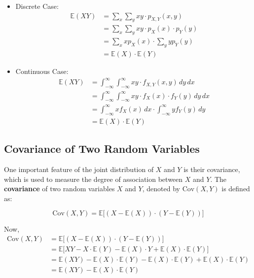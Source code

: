 \documentclass[twoside]{book}
\begin{document}
\begin{itemize}

\item{Discrete Case}:
\begin{align*}
    \mathbb{E}(XY) &= \sum_{x} \sum_{y} xy \cdot p_{X,Y}(x, y)\\
    &=\sum_{x} \sum_{y} xy \cdot p_{X}(x)\cdot p_{Y}(y)\\
    &= \sum_{x} x p_X(x) \cdot  \sum_{y} y p_Y(y) \\
    &= \mathbb{E}(X) \cdot \mathbb{E}(Y)
\end{align*}

\item{Continuous Case}:
\begin{align*}
    \mathbb{E}(XY) &= \int_{-\infty}^{\infty} \int_{-\infty}^{\infty} xy \cdot f_{X,Y}(x, y) \, dy \, dx\\
    &= \int_{-\infty}^{\infty} \int_{-\infty}^{\infty} xy \cdot f_X(x)\cdot f_Y(y) \, dy \, dx\\
    &= \int_{-\infty}^{\infty} x f_X(x) \, dx\cdot  \int_{-\infty}^{\infty} y f_Y(y) \, dy \\
    &= \mathbb{E}(X) \cdot \mathbb{E}(Y)
\end{align*}

\end{itemize}
\vspace{1em}


\subsection{Covariance of Two Random Variables}

One important feature of the joint distribution of $X$ and $Y$ is their covariance, which is used to measure the degree of association between $X$ and $Y$. The \textbf{covariance} of two random variables \( X \) and \( Y \), denoted by \( \mathrm{Cov}(X, Y) \) is defined as:
\begin{textbox}
    \[
\mathrm{Cov}(X, Y) = \mathbb{E}\big[(X - \mathbb{E}(X))\cdot (Y - \mathbb{E}(Y))\big]
\]
\end{textbox}

Now,
\begin{align*}
\mathrm{Cov}(X, Y)
&= \mathbb{E}\big[(X - \mathbb{E}(X))\cdot(Y - \mathbb{E}(Y))\big] \\
&= \mathbb{E}\big[XY - X\cdot \mathbb{E}(Y) - \mathbb{E}(X)\cdot Y + \mathbb{E}(X)\cdot \mathbb{E}(Y)\big] \\
&= \mathbb{E}(XY) - \mathbb{E}(X)\cdot \mathbb{E}(Y) - \mathbb{E}(X)\cdot \mathbb{E}(Y) + \mathbb{E}(X)\cdot \mathbb{E}(Y) \\
&= \mathbb{E}(XY) - \mathbb{E}(X)\cdot \mathbb{E}(Y)
\end{align*}
\end{document}
